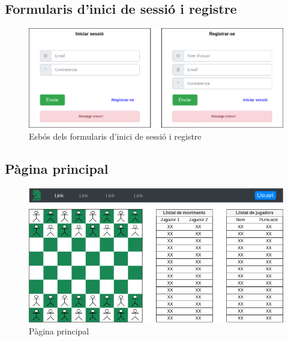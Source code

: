 \subsection{Formularis d'inici de sessió i registre}
\begin{figure}[H]
    \centering
    \includegraphics[width=\textwidth]{images/login.png}
    \caption{Esbós dels formularis d'inici de sessió i registre}
    \label{fig:Esbós dels formularis d'inici de sessió i registre}
\end{figure}
\subsection{Pàgina principal}
\begin{figure}[H]
    \centering
    \includegraphics[width=\textwidth]{images/index.png}
    \caption{Pàgina principal}
    \label{fig:Pàgina principal}
\end{figure}
